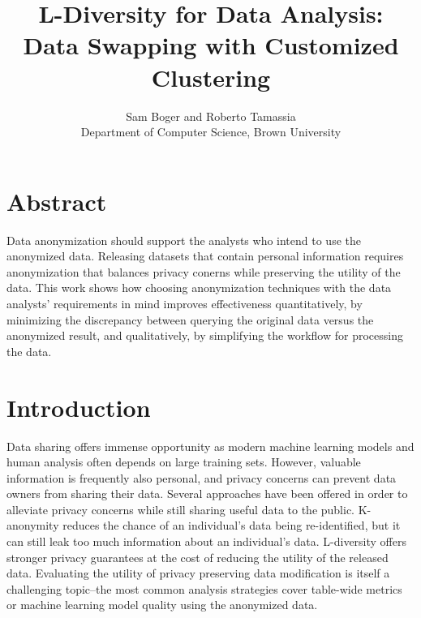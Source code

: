 

\date{}

\title{\Large \bf L-Diversity for Data Analysis:\\
  Data Swapping with Customized Clustering}

\author{
{\rm Sam Boger and Roberto Tamassia} \\
Department of Computer Science, Brown University

} %

\maketitle
\section*{Abstract}
Data anonymization should support the analysts who intend to use the anonymized data. Releasing datasets that contain personal information requires anonymization that balances privacy conerns while preserving the utility of the data. This work shows how choosing anonymization techniques with the data analysts' requirements in mind improves effectiveness quantitatively, by minimizing the discrepancy between querying the original data versus the anonymized result, and qualitatively, by simplifying the workflow for processing the data.

\section{Introduction}
Data sharing offers immense opportunity as modern machine learning models and human analysis often depends on large training sets. However, valuable information is frequently also personal, and privacy concerns can prevent data owners from sharing their data. Several approaches have been offered in order to alleviate privacy concerns while still sharing useful data to the public. K-anonymity reduces the chance of an individual’s data being re-identified, but it can still leak too much information about an individual's data. L-diversity offers stronger privacy guarantees at the cost of reducing the utility of the released data. Evaluating the utility of privacy preserving data modification is itself a challenging topic--the most common analysis strategies cover table-wide metrics or machine learning model quality using the anonymized data.


